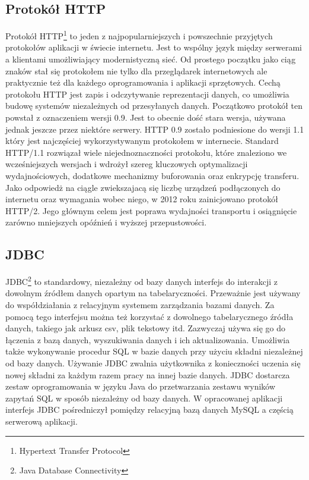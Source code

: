 \documentclass[12pt, twoside]{report}
\begin{document}
\subsection{Protokół HTTP}
Protokół HTTP\footnote{Hypertext Transfer Protocol} to jeden z najpopularniejszych i powszechnie przyjętych protokołów aplikacji w świecie internetu. Jest to wspólny język między serwerami a klientami umożliwiający modernistyczną sieć. Od prostego początku jako ciąg znaków stał się protokołem nie tylko dla przeglądarek internetowych ale praktycznie też dla każdego oprogramowania i aplikacji sprzętowych\cite{http}. Cechą protokołu HTTP jest zapis i odczytywanie reprezentacji danych, co umożliwia budowę systemów niezależnych od przesyłanych danych.
 Początkowo protokół ten powstał z oznaczeniem wersji 0.9. Jest to obecnie dość stara wersja, używana jednak jeszcze przez niektóre serwery. HTTP 0.9 zostało podniesione do wersji 1.1 który jest najczęściej wykorzystywanym protokołem w internecie. Standard HTTP/1.1 rozwiązał wiele niejednoznaczności protokołu, które znaleziono we wcześniejszych wersjach i wdrożył szereg kluczowych optymalizacji wydajnościowych, dodatkowe mechanizmy buforowania oraz enkrypcję transferu. Jako odpowiedż na ciągle zwiekszajacą się liczbę urządzeń podłączonych do internetu oraz wymagania wobec niego, w 2012 roku zainicjowano protokół HTTP/2. Jego głównym celem jest poprawa wydajności transportu i osiągnięcie zarówno mniejszych opóźnień i wyższej przepustowości.
\subsection{JDBC}
JDBC\footnote{Java Database Connectivity} to standardowy, niezależny od bazy danych interfejs do interakcji z dowolnym źródłem danych opartym na tabelaryczności. Przeważnie jest używany do współdziałania z relacyjnym systemem zarządzania bazami danych. Za pomocą tego interfejsu można też korzystać z dowolnego tabelarycznego źródła danych, takiego jak arkusz csv, plik tekstowy itd. Zazwyczaj używa się go do łączenia z bazą danych, wyszukiwania danych i ich aktualizowania. Umożliwia także wykonywanie procedur SQL w bazie danych przy użyciu składni niezależnej od bazy danych\cite{jdbc}. Używanie JDBC zwalnia użytkownika z konieczności uczenia się nowej składni za każdym razem pracy na innej bazie danych. JDBC dostarcza zestaw oprogramowania w języku Java do przetwarzania zestawu wyników zapytań SQL w sposób niezależny od bazy danych. W opracowanej aplikacji interfejs JDBC pośredniczył pomiędzy relacyjną bazą danych MySQL a częścią serwerową aplikacji.
\end{document}
